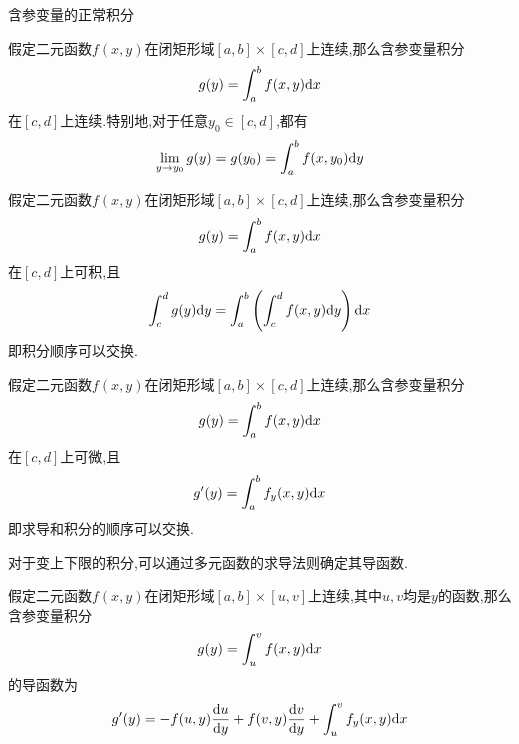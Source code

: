 \documentclass{ctexart}
\begin{document}
\pagestyle{empty}
\begin{center}\large 含参变量的正常积分\end{center}
\begin{formal}[连续性]
    假定二元函数$f(x,y)$在闭矩形域$[a,b]\times[c,d]$上连续,那么含参变量积分
    \[g(y)=\int_a^bf(x,y)\mathrm{d} x\]
    在$[c,d]$上连续.特别地,对于任意$y_0\in[c,d]$,都有
    \[\lim_{y\to y_0}g(y)=g(y_0)=\int_a^bf(x,y_0)\mathrm{d} y\]

\end{formal}
\begin{formal}[可积性]
    假定二元函数$f(x,y)$在闭矩形域$[a,b]\times[c,d]$上连续,那么含参变量积分
    \[g(y)=\int_a^bf(x,y)\mathrm{d} x\]
    在$[c,d]$上可积,且
    \[\int_c^d g(y)\mathrm{d} y=\int_a^b\left(\int_c^d f(x,y)\mathrm{d} y\right)\mathrm{d} x\]
    即积分顺序可以交换.

\end{formal}
\begin{formal}[可微性]
    假定二元函数$f(x,y)$在闭矩形域$[a,b]\times[c,d]$上连续,那么含参变量积分
    \[g(y)=\int_a^bf(x,y)\mathrm{d} x\]
    在$[c,d]$上可微,且
    \[g'(y)=\int_a^b f_y(x,y)\mathrm{d} x\]
    即求导和积分的顺序可以交换.

\end{formal}
对于变上下限的积分,可以通过多元函数的求导法则确定其导函数.
\begin{formal}[变上限含参积分的求导方法]
    假定二元函数$f(x,y)$在闭矩形域$[a,b]\times[u,v]$上连续,其中$u,v$均是$y$的函数,那么含参变量积分
    \[g(y)=\int_u^vf(x,y)\mathrm{d} x\]
    的导函数为
    \[g'(y)=-f(u,y)\dfrac{\mathrm{d} u}{\mathrm{d} y}+f(v,y)\dfrac{\mathrm{d} v}{\mathrm{d} y}+\int_u^vf_y(x,y)\mathrm{d} x\]
    
\end{formal}
\end{document}
